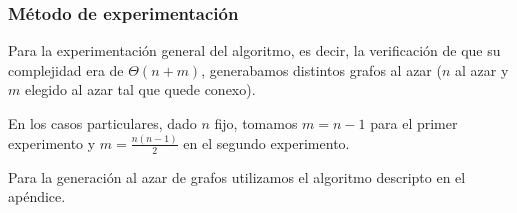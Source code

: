\subsubsection{M\'etodo de experimentación}

Para la experimentación general del algoritmo, es decir, la verificación de que su complejidad era de $\Theta(n+m)$, generabamos distintos grafos al azar ($n$ al azar y $m$ elegido al azar tal que quede conexo).

En los casos particulares, dado $n$ fijo, tomamos $m = n - 1$ para el primer experimento y $m = \frac{n (n - 1)}{2}$ en el segundo experimento.

Para la generación al azar de grafos utilizamos el algoritmo descripto en el apéndice. 
